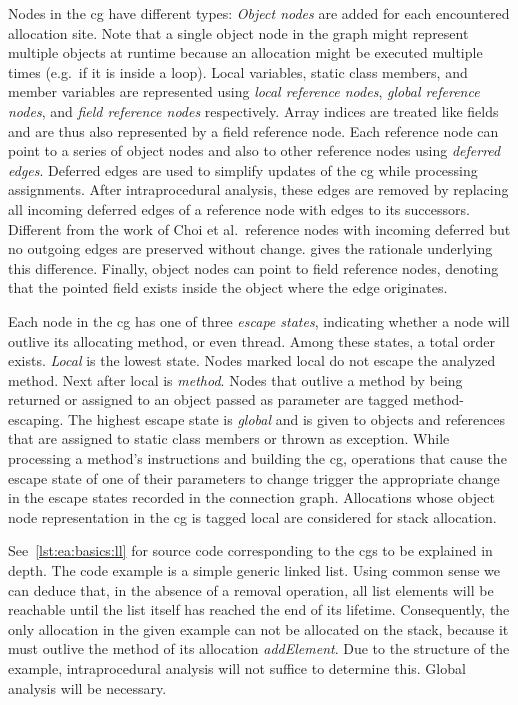 			Nodes in the \gls{cg} have different types: \emph{Object nodes} are added for each encountered allocation site.
			Note that a single object node in the graph might represent multiple objects at runtime because an allocation
			might be executed multiple times (e.g.\ if it is inside a loop). Local variables, static class members, and member
			variables are represented using \emph{local reference nodes}, \emph{global reference nodes}, and \emph{field
			reference nodes} respectively. Array indices are treated like fields and are thus also represented by a field
			reference node. Each reference node can point to a series of object nodes and also to other reference nodes using
			\emph{deferred edges}. Deferred edges are used to simplify updates of the \gls{cg} while processing assignments.
			After intraprocedural analysis, these edges are removed by replacing all incoming deferred edges of a reference
			node with edges to its successors. Different from the work of Choi et al.\ reference nodes with incoming deferred
			but no outgoing edges are preserved without change.  gives the rationale
			underlying this difference. Finally, object nodes can point to field reference nodes, denoting that the pointed
			field exists inside the object where the edge originates.

			Each node in the \gls{cg} has one of three \emph{escape states}, indicating whether a node will outlive its
			allocating method, or even thread. Among these states, a total order exists. \emph{Local} is the lowest state.
			Nodes marked local do not escape the analyzed method. Next after local is \emph{method}. Nodes that outlive
			a method by being returned or assigned to an object passed as parameter are tagged method-escaping. The highest
			escape state is \emph{global} and is given to objects and references that are assigned to static class members or
			thrown as exception. While processing a method's instructions and building the \gls{cg}, operations that cause the
			escape state of one of their parameters to change trigger the appropriate change in the escape states recorded in
			the connection graph. Allocations whose object node representation in the \gls{cg} is tagged local are considered
			for stack allocation.

			See~\cref{lst:ea:basics:ll} for source code corresponding to the \glspl{cg} to be explained in depth. The code
			example is a simple generic linked list. Using common sense we can deduce that, in the absence of a removal
			operation, all list elements will be reachable until the list itself has reached the end of its lifetime.
			Consequently, the only allocation in the given example can not be allocated on the stack, because it must outlive
			the method of its allocation \emph{addElement}. Due to the structure of the example, intraprocedural analysis will
			not suffice to determine this. Global analysis will be necessary.

